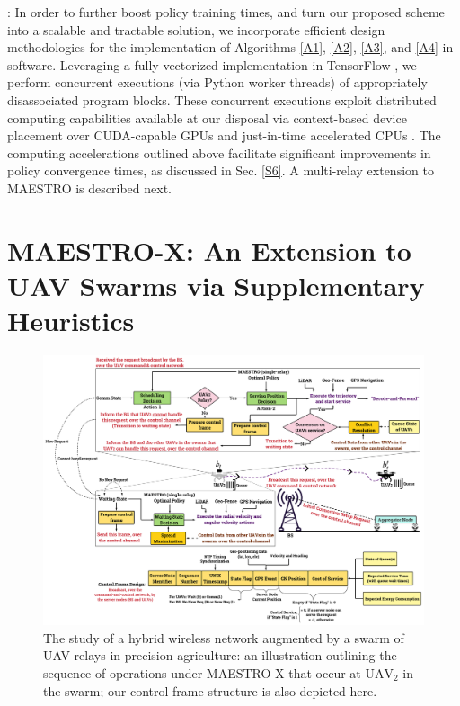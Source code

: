 \documentclass[12pt, draftcls, onecolumn]{IEEEtran}
\theoremstyle{plain}
\theoremstyle{definition}
\theoremstyle{remark}
\begin{document}
: In order to further boost policy training times, and turn our proposed scheme into a scalable and tractable solution, we incorporate efficient design methodologies for the implementation of Algorithms \ref{A1}, \ref{A2}, \ref{A3}, and \ref{A4} in software. Leveraging a fully-vectorized implementation in TensorFlow \cite{TF1}, we perform concurrent executions (via Python worker threads) of appropriately disassociated program blocks. These concurrent executions exploit distributed computing capabilities available at our disposal via context-based device placement over CUDA-capable GPUs and just-in-time accelerated CPUs \cite{TF2}. The computing accelerations outlined above facilitate significant improvements in policy convergence times, as discussed in Sec. \ref{S6}. A multi-relay extension to MAESTRO is described next.
\vspace{-3mm}


\section{MAESTRO-X: An Extension to UAV Swarms via Supplementary Heuristics}\label{S5}
\vspace{-2mm}

\begin{figure} [t]
    \centering
    \includegraphics[width=0.9\linewidth]{figs/System_Operation.png}
    \caption{The study of a hybrid wireless network augmented by a swarm of UAV relays in precision agriculture: an illustration outlining the sequence of operations under MAESTRO-X that occur at $\text{UAV}_{2}$ in the swarm; our control frame structure is also depicted here.}
    \vspace{-8mm}
    \label{F4}
\end{figure}
\end{document}
